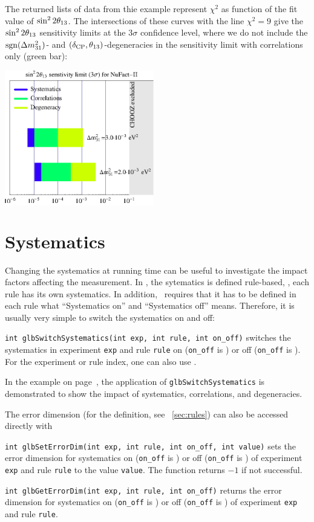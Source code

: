 {The returned lists of data from thie example represent $\chi^2$ 
as function of the fit value of $\sin^2 2 \theta_{13}$. The intersections of these
curves with the line $\chi^2 = 9$ give the $\sin^2 2 \theta_{13}$ sensitivity
limits at the $3 \sigma$ confidence level, where we do not include the
 $\mathrm{sgn}(\Delta m_{31}^2)$- and $(\delta_{\mathrm{CP}},\theta_{13})$-degeneracies in the sensitivity limit with correlations only (green bar):
\begin{center}
\colorbox{white}{\includegraphics[width=6.5cm]{barsex}}
\end{center}
}

\section{Systematics}

Changing the systematics at running time can be useful to investigate
the impact factors affecting the measurement.
In \GLOBES , the sytematics is defined rule-based, \ie, each rule
has its own systematics. In addition, \AEDL\ requires that it has to be
defined in each rule what ``Systematics on'' and ``Systematics off'' means.
Therefore, it is usually very simple to switch the systematics on and off:
\begin{function}
{\tt int glbSwitchSystematics(int exp, int rule, int on\_off)}
switches the systematics in experiment {\tt exp} and rule {\tt rule}
on ({\tt on\_off} is ) or off ({\tt on\_off} is ). For the experiment or
rule index, one can also use . 
\end{function}
In the example on page~\pageref{ex:barcharts}, the application of
{\tt glbSwitchSystematics} is demonstrated to show the impact of
systematics, correlations, and degeneracies.

The error dimension (for the definition, see \Sec~\ref{sec:rules}) can also be accessed directly with 
\begin{function}
{\tt int glbSetErrorDim(int exp, int rule, int on\_off, int value)}
sets the error dimension for systematics on ({\tt on\_off} is ) or off ({\tt on\_off} is ) of experiment {\tt exp} and rule {\tt rule} to the value {\tt value}. The function returns
$-1$ if not successful.
\end{function}
\begin{function}
{\tt int glbGetErrorDim(int exp, int rule, int on\_off)}
returns the error dimension for systematics on ({\tt on\_off} is ) or off ({\tt on\_off} is ) of experiment {\tt exp} and rule {\tt rule}.
\end{function}

